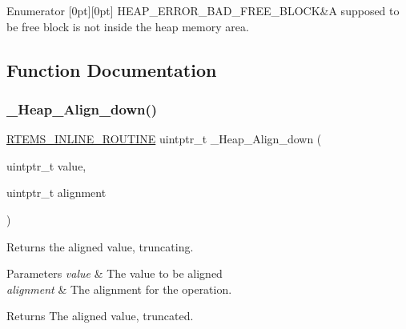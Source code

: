\begin{DoxyEnumFields}{Enumerator}
[0pt][0pt]{}\mbox{\label{group__RTEMSScoreHeap_gga9f62692d135584572333cc6d1759e5e4aed114f40b13a7bc4ac394bdd017e667d}} 
H\+E\+A\+P\+\_\+\+E\+R\+R\+O\+R\+\_\+\+B\+A\+D\+\_\+\+F\+R\+E\+E\+\_\+\+B\+L\+O\+CK&A supposed to be free block is not inside the heap memory area. \\
\hline

\end{DoxyEnumFields}


\subsection{Function Documentation}
\mbox{\label{group__RTEMSScoreHeap_ga2b11e4f1b69d3f6197165e4fb7f2e956}} 
\subsubsection{\texorpdfstring{\_Heap\_Align\_down()}{\_Heap\_Align\_down()}}
{\footnotesize\ttfamily \mbox{\hyperlink{group__RTEMSScoreBaseDefs_gac216239df231d5dbd15e3520b0b9313f}{R\+T\+E\+M\+S\+\_\+\+I\+N\+L\+I\+N\+E\+\_\+\+R\+O\+U\+T\+I\+NE}} uintptr\+\_\+t \+\_\+\+Heap\+\_\+\+Align\+\_\+down (\begin{DoxyParamCaption}\item[{uintptr\+\_\+t}]{value,  }\item[{uintptr\+\_\+t}]{alignment }\end{DoxyParamCaption})}



Returns the aligned value, truncating. 


\begin{DoxyParams}{Parameters}
{\em value} & The value to be aligned \\
\hline
{\em alignment} & The alignment for the operation.\\
\hline
\end{DoxyParams}
\begin{DoxyReturn}{Returns}
The aligned value, truncated. 
\end{DoxyReturn}
\mbox{\label{group__RTEMSScoreHeap_gaa7c54b3d49cb3fbcf12bbf7a7a45e8d5}} 
